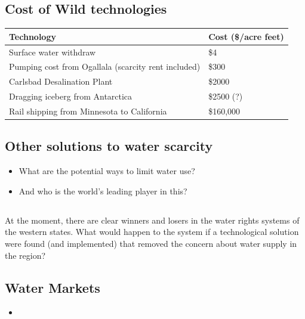 \documentclass[]{article}
\providecommand{\tightlist}{%
  \setlength{\itemsep}{0pt}\setlength{\parskip}{0pt}}
\begin{document}
\hypertarget{cost-of-wild-technologies}{%
\subsection{Cost of Wild technologies}\label{cost-of-wild-technologies}}

\begin{longtable}[]{@{}ll@{}}
\toprule
Technology & Cost (\$/acre feet)\tabularnewline
\midrule
\endhead
Surface water withdraw & \$4\tabularnewline
Pumping cost from Ogallala (scarcity rent included) &
\$300\tabularnewline
Carlsbad Desalination Plant & \$2000\tabularnewline
Dragging iceberg from Antarctica & \$2500 (?)\tabularnewline
Rail shipping from Minnesota to California & \$160,000\tabularnewline
\bottomrule
\end{longtable}

\hypertarget{other-solutions-to-water-scarcity}{%
\subsection{Other solutions to water
scarcity}\label{other-solutions-to-water-scarcity}}

\begin{itemize}
\tightlist
\item
  What are the potential ways to limit water use?
\item
  And who is the world's leading player in this?
\end{itemize}

\hypertarget{section-40}{%
\subsection{}\label{section-40}}

At the moment, there are clear winners and losers in the water rights
systems of the western states. What would happen to the system if a
technological solution were found (and implemented) that removed the
concern about water supply in the region?

\hypertarget{water-markets}{%
\subsection{Water Markets}\label{water-markets}}

\begin{itemize}
\item
\end{itemize}
\end{document}

